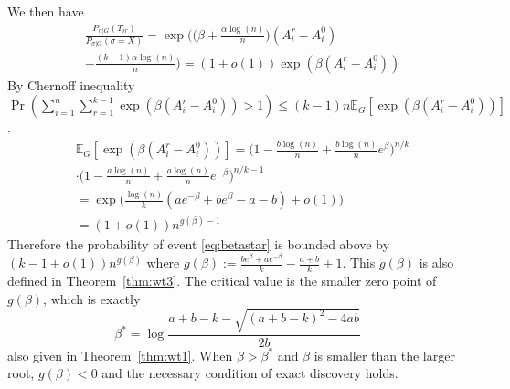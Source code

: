 \documentclass[conference]{IEEEtran}
\begin{document}
	We then have
	\begin{align}
	&\frac{P_{\sigma|G}(T_{ir})}
	{P_{\sigma|G}(\sigma=X)}
	= \exp\Big(\big(\beta+\frac{\alpha\log(n)}{n} \big) (A^r_i-A^0_i) \nonumber\\
	&-\frac{(k-1)\alpha\log(n)}{n} \Big) 
	= (1+o(1)) \exp ( \beta(A^r_i-A^0_i))
	\end{align}
	By Chernoff inequality $ \Pr(\sum_{i=1}^n\sum_{r=1}^{k-1}\exp ( \beta(A^r_i-A^0_i)) > 1) \leq (k-1)n\mathbb{E}_G[\exp (\beta (A^r_i-A^0_i))] $.
	\begin{align}
	&\mathbb{E}_G[\exp (\beta (A^r_i-A^0_i))]
	=\Big(1-\frac{b\log(n)}{n}+\frac{b\log(n)}{n} e^{\beta} \Big)^{n/k} \nonumber \\
	&\cdot \Big(1-\frac{a\log(n)}{n}+\frac{a\log(n)}{n} e^{-\beta} \Big)^{n/k-1}\nonumber\\
	& = 
	\exp\Big(\frac{\log(n)}{k} ( a e^{-\beta}+b e^{\beta} -a-b )
	+o(1) \Big)\nonumber \\
	& = (1+o(1)) n^{g(\beta)-1} \label{eq:gbetaminus1}
	\end{align}
	Therefore the probability of event \eqref{eq:betastar} is bounded above by $ (k-1 + o(1)) n^{g(\beta)}$
	where $g(\beta)  := \frac{b e^{\beta}+a e^{-\beta}}{k}-\frac{a+b}{k}+1$. This $g(\beta)$ is also defined in Theorem~\ref{thm:wt3}.
	The critical value is the smaller zero point of $g(\beta)$, which is exactly
	$$
	\beta^* = \log\frac{a+b-k-\sqrt{(a+b-k)^2-4ab}}{2 b}
	$$
	also given in Theorem~\ref{thm:wt1}.
	When $\beta > \beta^*$ and $\beta$ is smaller than the larger root, $g(\beta) < 0$ and the necessary condition of exact discovery holds.
	
\end{document}
